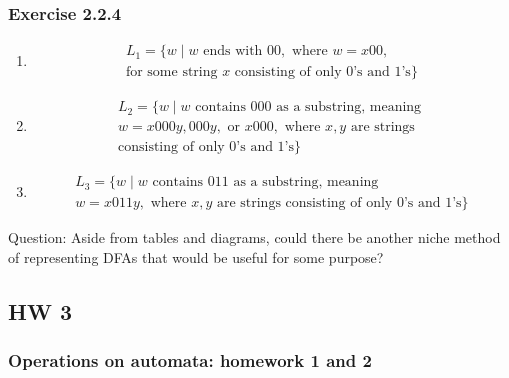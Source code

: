 \documentclass{article}
\theoremstyle{theorem}
\theoremstyle{definition}
\theoremstyle{remark}
\begin{document}
\subsubsection{Exercise 2.2.4}


\begin{enumerate}
    \item 
    \begin{multline*}
        L_1 = \{ w \mid w \text{ ends with } 00, \text{ where } w = x00, \\
        \text{for some string } x \text{ consisting of only 0's and 1's} \}
    \end{multline*}

    \item 
    \begin{multline*}
        L_2 = \{ w \mid w \text{ contains } 000 \text{ as a substring, meaning } \\
        w = x000y, 000y, \text{ or } x000, \text{ where } x, y \text{ are strings} \\
        \text{consisting of only 0's and 1's} \}
    \end{multline*}

    \item 
    \begin{multline*}
        L_3 = \{ w \mid w \text{ contains } 011 \text{ as a substring, meaning } \\
        w = x011y, \text{ where } x, y \text{ are strings consisting of only 0's and 1's} \}
    \end{multline*}
\end{enumerate}

Question: Aside from tables and diagrams, could there be another niche method of representing DFAs that would be useful for some purpose?

\subsection{HW 3}

\subsubsection{Operations on automata: homework 1 and 2}
\end{document}
